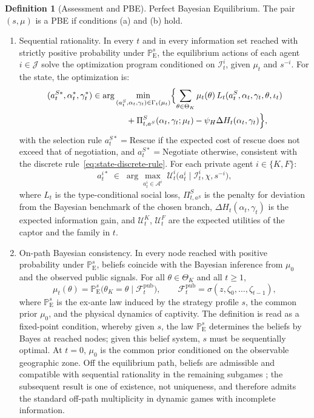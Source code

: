 \documentclass[pdflatex,sn-mathphys-ay]{sn-jnl}
\providecommand{\textcite}{\citet}
\theoremstyle{plain}
\theoremstyle{definition}
\newtheorem{definition}[theorem]{Definition}
\newcommand{\ProbE}{\mathbb{P}_{\mathrm{E}}}
\newcommand{\ThetaK}{\Theta_K}
\newcommand{\1}{\mathbf{1}}
\begin{document}
\begin{definition}[Assessment and PBE]
\smallskip
\noindent Perfect Bayesian Equilibrium. The pair $(s,\mu)$ is a PBE if conditions \textup{(a)} and \textup{(b)} hold.
\begin{enumerate}
  \item[\textup{(a)}] Sequential rationality. In every $t$ and in every information set reached with strictly positive probability under $\ProbE^s$, the equilibrium actions of each agent $i\in\mathcal{J}$ solve the optimization program conditioned on $\mathcal{I}_t^i$, given $\mu_t$ and $s^{-i}$. For the state, the optimization is:
  \[
  \begin{aligned}
  (a_t^{S\ast},\alpha_t^\ast,\gamma_t^\ast)
  &\in
  \arg\min_{(a_t^S,\alpha_t,\gamma_t)\in\Gamma_t(\mu_t)}
  \Bigl\{
  \sum_{\theta\in\ThetaK}\mu_t(\theta)\,L_t(a_t^S,\alpha_t,\gamma_t,\theta,\iota_t)\\
  &\qquad\qquad
  +\Pi_{t,a^S}^S(\alpha_t,\gamma_t;\mu_t)-\psi_H\Delta H_t(\alpha_t,\gamma_t)
  \Bigr\},
  \end{aligned}
  \]
  with the selection rule $a_t^{S\ast}=\text{Rescue}$ if the expected cost of rescue does not exceed that of negotiation, and $a_t^{S\ast}=\text{Negotiate}$ otherwise, consistent with the discrete rule~\eqref{eq:state-discrete-rule}. For each private agent $i\in\{K,F\}$:
  \[
  a_t^{i\ast}\;\in\;
  \arg\max_{a_t^i\in\mathcal{A}^i}
  \;\mathcal{U}^i_t\!\bigl(a_t^i\mid \mathcal{I}_t^i,\chi,s^{-i}\bigr),
  \]
  where $L_t$ is the type-conditional social loss, $\Pi_{t,a^S}^S$ is the penalty for deviation from the Bayesian benchmark of the chosen branch, $\Delta H_t(\alpha_t,\gamma_t)$ is the expected information gain, and $\mathcal{U}^K_t$, $\mathcal{U}^F_t$ are the expected utilities of the captor and the family in $t$.

  \item[\textup{(b)}] On-path Bayesian consistency. In every node reached with positive probability under $\ProbE^s$, beliefs coincide with the Bayesian inference from $\mu_0$ and the observed public signals. For all $\theta\in\ThetaK$ and all $t\ge 1$,
  \begin{equation}
  \label{eq:def712-bayes-mu}
  \mu_t(\theta)=\ProbE^s\!\bigl(\theta_K=\theta\mid \mathcal{F}_t^{\mathrm{pub}}\bigr),
  \qquad
  \mathcal{F}_t^{\mathrm{pub}}=\sigma(z,\zeta_0,\ldots,\zeta_{t-1}),
  \end{equation}
  where $\ProbE^s$ is the ex-ante law induced by the strategy profile $s$, the common prior $\mu_0$, and the physical dynamics of captivity. The definition is read as a fixed-point condition, whereby given $s$, the law $\ProbE^s$ determines the beliefs by Bayes at reached nodes; given this belief system, $s$ must be sequentially optimal. At $t=0$, $\mu_0$ is the common prior conditioned on the observable geographic zone. Off the equilibrium path, beliefs are admissible and compatible with sequential rationality in the remaining subgames \textcite{FudenbergTirole1991,KrepsWilson1982}; the subsequent result is one of existence, not uniqueness, and therefore admits the standard off-path multiplicity in dynamic games with incomplete information.
\end{enumerate}
\end{definition}
\end{document}
